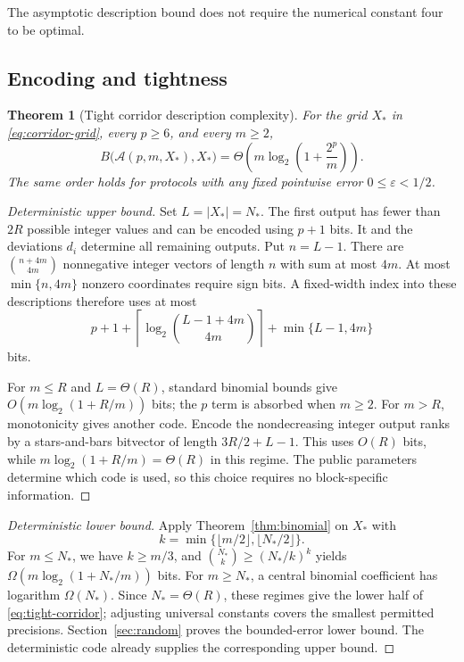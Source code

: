 \documentclass[11pt,reqno]{amsart}
\newtheorem{theorem}{Theorem}[section]
\theoremstyle{definition}
\theoremstyle{remark}
\numberwithin{equation}{section}
\begin{document}
The asymptotic description bound does not require the numerical constant
four to be optimal.

\subsection{Encoding and tightness}

\begin{samepage}
\begin{theorem}[Tight corridor description complexity]
\label{thm:corridor}
For the grid $X_\ast$ in \eqref{eq:corridor-grid}, every $p\geq 6$, and
every $m\geq 2$,
\begin{equation}
\label{eq:tight-corridor}
 B\bigl(\mathcal{A}(p,m,X_\ast),X_\ast\bigr)
 =\Theta\!\left(m\log_2\left(1+\frac{2^p}{m}\right)\right).
\end{equation}
The same order holds for protocols with any fixed pointwise error
$0\leq\varepsilon<1/2$.
\end{theorem}
\end{samepage}

\begin{proof}[Deterministic upper bound]
Set $L=|X_\ast|=N_\ast$. The first output has fewer than $2R$ possible
integer values and can be encoded using $p+1$ bits. It and the
deviations $d_i$ determine all remaining outputs. Put $n=L-1$.
There are $\binom{n+4m}{4m}$ nonnegative integer vectors of length $n$
with sum at most $4m$. At most $\min\{n,4m\}$ nonzero coordinates
require sign bits. A fixed-width index into these descriptions
therefore uses at most
\begin{equation}
\label{eq:enumerative-budget}
 p+1+\left\lceil\log_2\binom{L-1+4m}{4m}\right\rceil
       +\min\{L-1,4m\}
\end{equation}
bits.

For $m\leq R$ and $L=\Theta(R)$, standard binomial bounds give
$O(m\log_2(1+R/m))$ bits; the $p$ term is absorbed when $m\geq 2$.
For $m>R$, monotonicity gives another code. Encode the nondecreasing
integer output ranks by a stars-and-bars bitvector of length
$3R/2+L-1$. This uses $O(R)$ bits, while
$m\log_2(1+R/m)=\Theta(R)$ in this regime. The public parameters
determine which code is used, so this choice requires no block-specific
information.
\end{proof}

\begin{proof}[Deterministic lower bound]
Apply Theorem~\ref{thm:binomial} on $X_\ast$ with
\[
 k=\min\{\lfloor m/2\rfloor,\lfloor N_\ast/2\rfloor\}.
\]
For $m\leq N_\ast$, we have $k\geq m/3$, and
$\binom{N_\ast}{k}\geq(N_\ast/k)^k$ yields
$\Omega(m\log_2(1+N_\ast/m))$ bits. For $m\geq N_\ast$, a central
binomial coefficient has logarithm $\Omega(N_\ast)$. Since
$N_\ast=\Theta(R)$, these regimes give the lower half of
\eqref{eq:tight-corridor}; adjusting universal constants covers the
smallest permitted precisions. Section~\ref{sec:random} proves the
bounded-error lower bound. The deterministic code already supplies
the corresponding upper bound.
\end{proof}
\end{document}
